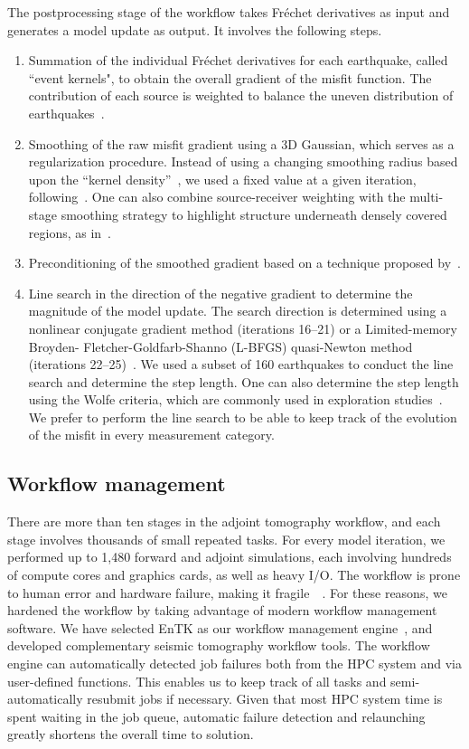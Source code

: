 \documentclass[extra,mreferee]{gji}
\begin{document}
The postprocessing stage of the workflow takes Fr\'echet derivatives as input and
generates a model update as output.
It involves the following steps.
\begin{enumerate}
  \item Summation of the individual Fr\'echet derivatives for each earthquake, called ``event kernels", to obtain the overall gradient of the misfit function. The contribution of each source is weighted to balance
    the uneven distribution of earthquakes~\citep{Ruanetal2018}.
  \item Smoothing of the raw misfit gradient using a 3D Gaussian, which
    serves as a regularization procedure. Instead of using a changing
    smoothing radius based upon the ``kernel density''~\citep{bozdaug2016global},
    we used a fixed value at a given iteration, following~\cite{zhu2012structure}. One can also combine source-receiver weighting with the multi-stage smoothing strategy to highlight structure underneath densely covered regions, as in~\citet{bozdaug2016global}.
  \item Preconditioning of the smoothed gradient based on a technique proposed by~\cite{luo2013strategies}.
  \item Line search in the direction of the negative gradient to determine the magnitude of the model update.
  The search direction is determined using a nonlinear conjugate gradient method (iterations 16--21) or a Limited-memory Broyden- Fletcher-Goldfarb-Shanno (L-BFGS) quasi-Newton method (iterations 22--25)~\citep{wright1999numerical,NoWr06}.
  We used a subset of 160 earthquakes to conduct the line search and determine the step length.
  One can also determine the step length using the Wolfe criteria, which are commonly used in exploration studies~\citep{NoWr06}. We prefer to perform the line search to be able to keep track of the evolution of the misfit in every measurement category.
\end{enumerate}

\subsection{Workflow management}

There are more than ten stages in the adjoint tomography workflow,
and each stage involves thousands of small repeated tasks.
For every model iteration,
we performed up to 1,480 forward and adjoint simulations, each involving hundreds of
compute cores and graphics cards, as well as heavy I/O.
The workflow is prone to human error and hardware failure, making it fragile~~\citep{Lefebvre2018}.
For these reasons, we hardened the workflow by taking advantage of modern
workflow management software.
We have selected EnTK as our
workflow management engine~\citep{EnTK2017}, and developed complementary seismic tomography
workflow tools.
The workflow engine can automatically detected job failures both from the
HPC system and via user-defined functions. This enables us to keep track of
all tasks and semi-automatically resubmit jobs if necessary.
Given that most HPC system time is spent waiting in the job queue, automatic
failure detection and relaunching greatly shortens the overall time to solution.
\end{document}
